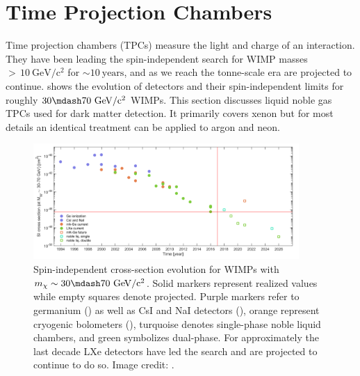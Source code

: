 \section{Time Projection Chambers}
\label{sec:tpcs}
Time projection chambers (TPCs) measure the light and charge of an interaction.  They have been leading the
spin-independent search for WIMP masses ${>}\, 10\ \mathrm{GeV/c^2}$ for ${\sim}10\ \mathrm{years}$, and as we reach the tonne-scale era
are projected to continue.   shows the evolution of detectors and their spin-independent limits for roughly
$30 \mdash 70\ \mathrm{GeV/c^2}$ WIMPs.  This section discusses liquid noble gas TPCs used for dark matter detection.  It primarily covers
xenon but for most details an identical treatment can be applied to argon and neon.

\begin{figure}
\centering
\includegraphics[width=0.9\textwidth]{SensitivityEvolutionBetter}
\caption{Spin-independent cross-section evolution for WIMPs with $m_{\chi} \sim 30 \mdash 70\ \mathrm{GeV/c^2}$.  Solid markers represent
realized
values while empty squares denote projected.  Purple markers refer to germanium () as well as CsI and NaI
detectors (), orange represent cryogenic bolometers (), turquoise denotes single-phase
noble liquid chambers, and green symbolizes dual-phase.  For approximately the last decade LXe detectors have led the search and are
projected to continue to do so.  Image credit: .}
\label{fig:sensitivity_evo}
\end{figure}

